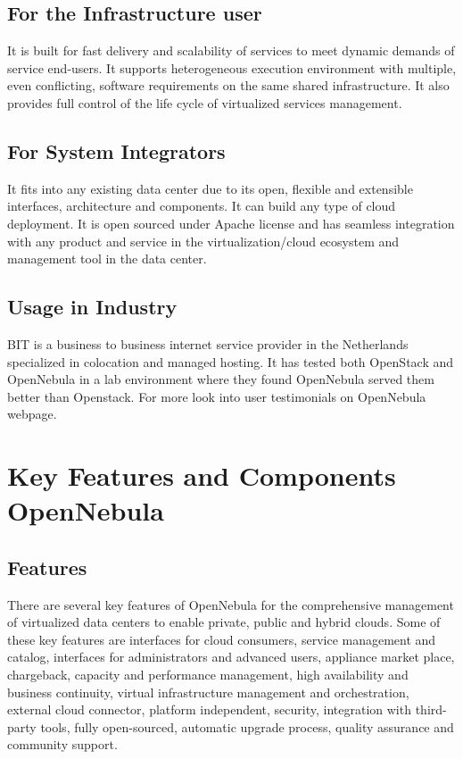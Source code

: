 \documentclass[9pt,twocolumn,twoside]{styles/osajnl}
\begin{document}
\subsection{For the Infrastructure user}

It is built for fast delivery and scalability of services to meet 
dynamic demands of service end-users. It supports heterogeneous 
execution environment with multiple, even conflicting, software 
requirements on the same shared infrastructure. It also provides full 
control of the life cycle of virtualized services management.

\subsection{For System Integrators}

It fits into any existing data center due to its open, flexible and 
extensible interfaces, architecture and components. It can build any 
type of cloud deployment. It is open sourced under Apache license and 
has seamless integration with any product and service in the 
virtualization/cloud ecosystem and management tool in the data 
center.

\subsection{Usage in Industry}
{BIT is a business to business internet service provider in the Netherlands 
specialized in colocation and managed hosting. It has tested both OpenStack and
OpenNebula in a lab environment where they found OpenNebula served them 
better than Openstack}\cite{www-opennebula-bit}. {For more look into user testimonials on 
OpenNebula webpage}\cite{www-opennebula-usertests}.

\section{Key Features and Components OpenNebula}

\subsection{Features}
There are several key {features of 
OpenNebula}\cite{www-features-opennebula} for the comprehensive 
management of virtualized data centers to enable private, public and 
hybrid clouds. Some of these key features are interfaces for cloud 
consumers, service management and catalog, interfaces for 
administrators and advanced users, appliance market place, 
chargeback, capacity and performance management, high availability 
and business continuity, virtual infrastructure management and 
orchestration, external cloud connector, platform independent, 
security, integration with third-party tools, fully open-sourced, 
automatic upgrade process, quality assurance and community support.
\end{document}
